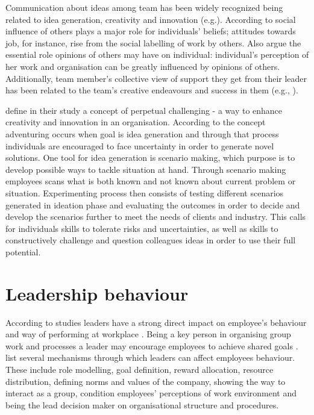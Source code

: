 Communication about ideas among team has been widely recognized being related to idea generation, creativity and innovation (e.g.\citep{robinson1997corporate,mumford2002social,monge1992communication,amabile1996assessing}). According to \citet{staw1989tradeoff} social influence of others plays a major role for individuals' beliefs; attitudes towards job, for instance, rise from the social labelling of work by others.  Also \citet{salancik1978social} argue the essential role opinions of others may have on individual: individual's perception of her work and organisation can be greatly influenced by opinions of others. Additionally, team member's collective view of support they get from their leader has been related to the team's creative endeavours and success in them (e.g., \citep{amabile1998kill,amabile1996assessing}). 
  
\citet{andriopoulos2000enhancing} define in their study a concept of perpetual challenging - a way to enhance creativity and innovation in an organisation. According to the concept adventuring occurs when goal is idea generation and through that process individuals are encouraged to face uncertainty in order to generate novel solutions. One tool for idea generation is scenario making, which purpose is to develop possible ways to tackle situation at hand. Through scenario making employees scans what is both known and not known about current problem or situation.  Experimenting process then consists of testing different scenarios generated in ideation phase and evaluating the outcomes in order to decide and develop the scenarios further to meet the needs of clients and industry. This calls for individuals skills to tolerate risks and uncertainties, as well as skills to constructively challenge and question colleagues ideas in order to use their full potential. \citet{andriopoulos2000enhancing}

\section{Leadership behaviour}
According to studies leaders have a strong direct impact on employee's behaviour and way of performing at workplace \citep{katz1978social,redmond1993putting}. Being a key person in organising group work and processes a leader may encourage employees to achieve shared goals \citep{amabile1998kill}. \citet{avolio1988transformational} list several mechanisms through which leaders can affect employees behaviour. These include role modelling, goal definition, reward allocation, resource distribution, defining norms and values of the company, showing the way to interact as a group, condition employees' perceptions of work environment and being the lead decision maker on organisational structure and procedures.

